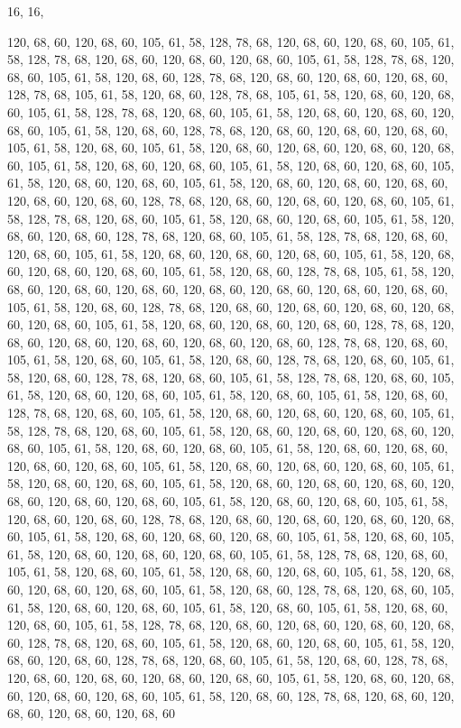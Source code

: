 16, 16,

120, 68, 60, 120, 68, 60, 105, 61, 58, 128, 78, 68, 120, 68, 60, 120,
68, 60, 105, 61, 58, 128, 78, 68, 120, 68, 60, 120, 68, 60, 120, 68,
60, 105, 61, 58, 128, 78, 68, 120, 68, 60, 105, 61, 58, 120, 68, 60,
128, 78, 68, 120, 68, 60, 120, 68, 60, 120, 68, 60, 128, 78, 68, 105,
61, 58, 120, 68, 60, 128, 78, 68, 105, 61, 58, 120, 68, 60, 120, 68,
60, 105, 61, 58, 128, 78, 68, 120, 68, 60, 105, 61, 58, 120, 68, 60,
120, 68, 60, 120, 68, 60, 105, 61, 58, 120, 68, 60, 128, 78, 68, 120,
68, 60, 120, 68, 60, 120, 68, 60, 105, 61, 58, 120, 68, 60, 105, 61,
58, 120, 68, 60, 120, 68, 60, 120, 68, 60, 120, 68, 60, 105, 61, 58,
120, 68, 60, 120, 68, 60, 105, 61, 58, 120, 68, 60, 120, 68, 60, 105,
61, 58, 120, 68, 60, 120, 68, 60, 105, 61, 58, 120, 68, 60, 120, 68,
60, 120, 68, 60, 120, 68, 60, 120, 68, 60, 128, 78, 68, 120, 68, 60,
120, 68, 60, 120, 68, 60, 105, 61, 58, 128, 78, 68, 120, 68, 60, 105,
61, 58, 120, 68, 60, 120, 68, 60, 105, 61, 58, 120, 68, 60, 120, 68,
60, 128, 78, 68, 120, 68, 60, 105, 61, 58, 128, 78, 68, 120, 68, 60,
120, 68, 60, 105, 61, 58, 120, 68, 60, 120, 68, 60, 120, 68, 60, 105,
61, 58, 120, 68, 60, 120, 68, 60, 120, 68, 60, 105, 61, 58, 120, 68,
60, 128, 78, 68, 105, 61, 58, 120, 68, 60, 120, 68, 60, 120, 68, 60,
120, 68, 60, 120, 68, 60, 120, 68, 60, 120, 68, 60, 105, 61, 58, 120,
68, 60, 128, 78, 68, 120, 68, 60, 120, 68, 60, 120, 68, 60, 120, 68,
60, 120, 68, 60, 105, 61, 58, 120, 68, 60, 120, 68, 60, 120, 68, 60,
128, 78, 68, 120, 68, 60, 120, 68, 60, 120, 68, 60, 120, 68, 60, 120,
68, 60, 128, 78, 68, 120, 68, 60, 105, 61, 58, 120, 68, 60, 105, 61,
58, 120, 68, 60, 128, 78, 68, 120, 68, 60, 105, 61, 58, 120, 68, 60,
128, 78, 68, 120, 68, 60, 105, 61, 58, 128, 78, 68, 120, 68, 60, 105,
61, 58, 120, 68, 60, 120, 68, 60, 105, 61, 58, 120, 68, 60, 105, 61,
58, 120, 68, 60, 128, 78, 68, 120, 68, 60, 105, 61, 58, 120, 68, 60,
120, 68, 60, 120, 68, 60, 105, 61, 58, 128, 78, 68, 120, 68, 60, 105,
61, 58, 120, 68, 60, 120, 68, 60, 120, 68, 60, 120, 68, 60, 105, 61,
58, 120, 68, 60, 120, 68, 60, 105, 61, 58, 120, 68, 60, 120, 68, 60,
120, 68, 60, 120, 68, 60, 105, 61, 58, 120, 68, 60, 120, 68, 60, 120,
68, 60, 105, 61, 58, 120, 68, 60, 120, 68, 60, 105, 61, 58, 120, 68,
60, 120, 68, 60, 120, 68, 60, 120, 68, 60, 120, 68, 60, 120, 68, 60,
105, 61, 58, 120, 68, 60, 120, 68, 60, 105, 61, 58, 120, 68, 60, 120,
68, 60, 128, 78, 68, 120, 68, 60, 120, 68, 60, 120, 68, 60, 120, 68,
60, 105, 61, 58, 120, 68, 60, 120, 68, 60, 120, 68, 60, 105, 61, 58,
120, 68, 60, 105, 61, 58, 120, 68, 60, 120, 68, 60, 120, 68, 60, 105,
61, 58, 128, 78, 68, 120, 68, 60, 105, 61, 58, 120, 68, 60, 105, 61,
58, 120, 68, 60, 120, 68, 60, 105, 61, 58, 120, 68, 60, 120, 68, 60,
120, 68, 60, 105, 61, 58, 120, 68, 60, 128, 78, 68, 120, 68, 60, 105,
61, 58, 120, 68, 60, 120, 68, 60, 105, 61, 58, 120, 68, 60, 105, 61,
58, 120, 68, 60, 120, 68, 60, 105, 61, 58, 128, 78, 68, 120, 68, 60,
120, 68, 60, 120, 68, 60, 120, 68, 60, 128, 78, 68, 120, 68, 60, 105,
61, 58, 120, 68, 60, 120, 68, 60, 105, 61, 58, 120, 68, 60, 120, 68,
60, 128, 78, 68, 120, 68, 60, 105, 61, 58, 120, 68, 60, 128, 78, 68,
120, 68, 60, 120, 68, 60, 120, 68, 60, 120, 68, 60, 105, 61, 58, 120,
68, 60, 120, 68, 60, 120, 68, 60, 120, 68, 60, 105, 61, 58, 120, 68,
60, 128, 78, 68, 120, 68, 60, 120, 68, 60, 120, 68, 60, 120, 68, 60
